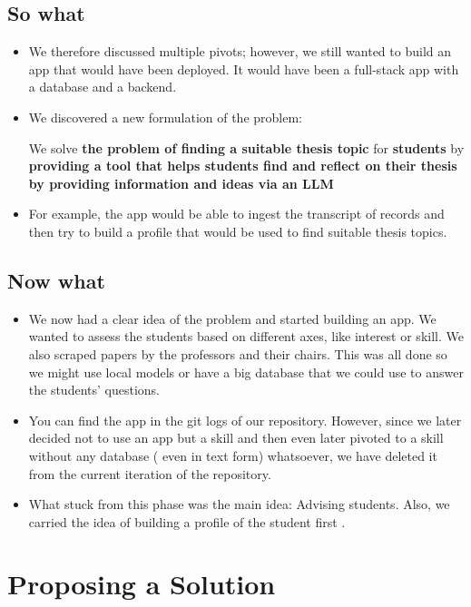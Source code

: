 \documentclass[11pt,a4paper]{article}
\begin{document}
\subsection*{So what}
\begin{itemize}
  \item We therefore discussed multiple pivots; however, we still wanted to build an app that would have been deployed. It would have been a full-stack app with a database and a backend.
  \item We discovered a new formulation of the problem: 
 \begin{infobox}
  We solve \textbf{the problem of finding a suitable thesis topic} for \textbf{students} by \textbf{providing a tool that helps students find and reflect on their thesis by providing information and ideas via an LLM}
\end{infobox}
  \item For example, the app would be able to ingest the transcript of records and then try to build a profile that would be used to find suitable thesis topics.
\end{itemize}

\subsection*{Now what}
\begin{itemize}
  \item We now had a clear idea of the problem and started building an app. We wanted to assess the students based on different axes, like interest or skill. We also scraped papers by the professors and their chairs. This was all done so we might use local models or have a big database that we could use to answer the students' questions.
  \item You can find the app in the git logs of our repository. However, since we later decided not to use an app but a skill and then even later pivoted to a skill without any database ( even in text form) whatsoever, we have deleted it from the current iteration of the repository.
  \item What stuck from this phase was the main idea: Advising students. Also, we carried the idea of building a profile of the student first
. \end{itemize}



\section{Proposing a Solution}
\end{document}
